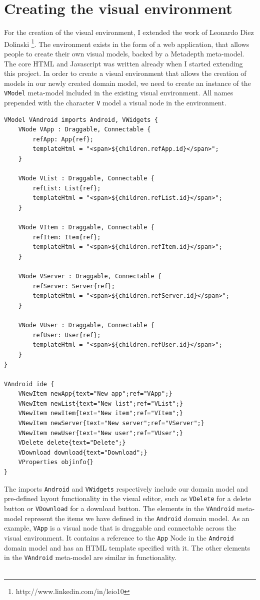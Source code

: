 \section{Creating the visual environment}

For the creation of the visual environment, I extended the work of Leonardo Diez Dolinski \footnote{http://www.linkedin.com/in/leio10}. The environment exists in the form of a web application, that allows people to create their own visual models, backed by a Metadepth meta-model. The core HTML and Javascript was written already when I started extending this project. In order to create a visual environment that allows the creation of models in our newly created domain model, we need to create an instance of the \texttt{VModel} meta-model included in the existing visual environment. All names prepended with the character \texttt{V} model a visual node in the environment. 
\begin{lstlisting}[label=domain-mm,caption=Domain meta-model, captionpos=t]
VModel VAndroid imports Android, VWidgets {
	VNode VApp : Draggable, Connectable {
        refApp: App{ref};
        templateHtml = "<span>${children.refApp.id}</span>";
    }

    VNode VList : Draggable, Connectable {
    	refList: List{ref};
    	templateHtml = "<span>${children.refList.id}</span>";
    }

	VNode VItem : Draggable, Connectable {
    	refItem: Item{ref};
    	templateHtml = "<span>${children.refItem.id}</span>";
    }

    VNode VServer : Draggable, Connectable {
        refServer: Server{ref};
        templateHtml = "<span>${children.refServer.id}</span>";
    }

    VNode VUser : Draggable, Connectable {
    	refUser: User{ref};
    	templateHtml = "<span>${children.refUser.id}</span>";
    }
}

VAndroid ide {
	VNewItem newApp{text="New app";ref="VApp";}
    VNewItem newList{text="New list";ref="VList";}
    VNewItem newItem{text="New item";ref="VItem";}
    VNewItem newServer{text="New server";ref="VServer";}
    VNewItem newUser{text="New user";ref="VUser";}
    VDelete delete{text="Delete";}
    VDownload download{text="Download";}
    VProperties objinfo{}
}
\end{lstlisting}
The imports \texttt{Android} and \texttt{VWidgets} respectively include our domain model and pre-defined layout functionality in the visual editor, such as \texttt{VDelete} for a delete button or \texttt{VDownload} for a download button. The elements in the \texttt{VAndroid} meta-model represent the items we have defined in the \texttt{Android} domain model. As an example, \texttt{VApp} is a visual node that is draggable and connectable across the visual environment. It contains a reference to the \texttt{App} Node in the \texttt{Android} domain model and has an HTML template specified with it. The other elements in the \texttt{VAndroid} meta-model are similar in functionality. \\ \\
